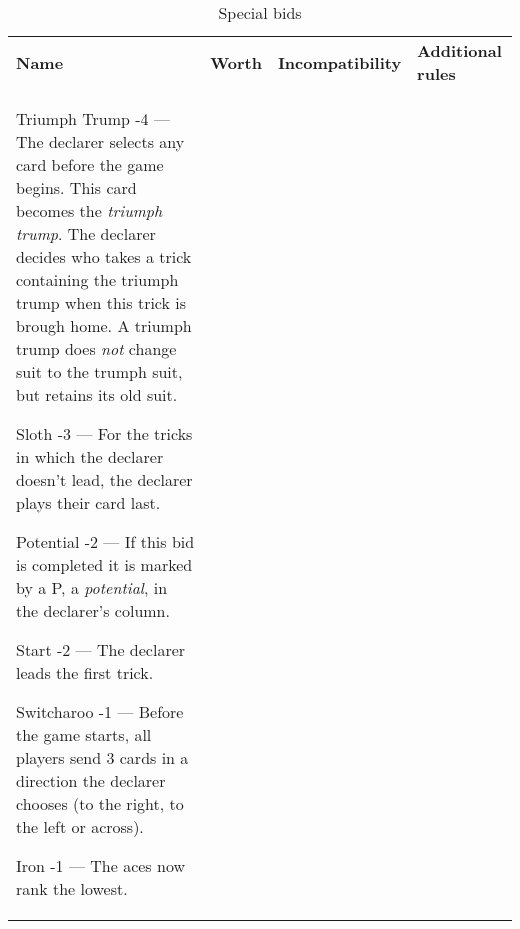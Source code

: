 %
%
%
%

\newcommand{\nonTrump}{\textnormal{non-trump bids}}

\begin{table}
	\caption{Special bids}\label{tab:specialBids}
	\begin{center}
		\begin{tabularx}{\textwidth}{
			l
			S[table-number-alignment=center, table-figures-decimal=0]
			p{3cm}
			|X
		}
			\textbf{Name} &
			\textbf{Worth} &
			\textbf{Incompatibility} &
			\textbf{Additional rules}
			\\[-3ex]

			\specialBidItem%
			{Triumph Trump}
			{-4}
			{---}
			{%
				The declarer selects any card before the game begins. This card becomes the \emph{triumph trump}. The declarer decides who takes a trick containing the triumph trump when this trick is brough home. A triumph trump does \emph{not} change suit to the trumph suit, but retains its old suit.
			}

			\specialBidItem%
			{Sloth}
			{-3}
			{---}
			{%
				For the tricks in which the declarer doesn't lead, the declarer plays their card last.
			}

			\specialBidItem%
			{Potential}
			{-2}
			{---}
			{%
				If this bid is completed it is marked by a P, a \emph{potential}, in the declarer's column.
			}

			\specialBidItem%
			{Start}
			{-2}
			{---}
			{%
				The declarer leads the first trick.
			}

			\specialBidItem%
			{Switcharoo}
			{-1}
			{---}
			{%
				Before the game starts, all players send 3 cards in a direction the declarer chooses (to the right, to the left or across).
			}

			\specialBidItem%
			{Iron}
			{-1}
			{---}
			{%
				The aces now rank the lowest.
			}


\end{tabularx}
\end{center}
\end{table}
